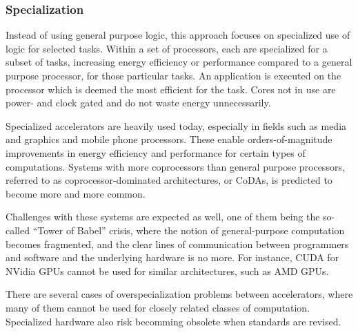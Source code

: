 
\subsubsection{Specialization}
Instead of using general purpose logic, this approach focuses on specialized use of logic for selected tasks.
Within a set of processors, each are specialized for a subset of tasks, increasing energy efficiency or performance compared to a general purpose processor, for those particular tasks.
An application is executed on the processor which is deemed the most efficient for the task.
Cores not in use are power- and clock gated and do not waste energy unnecessarily.

Specialized accelerators are heavily used today, especially in fields such as media and graphics and mobile phone processors.
These enable orders-of-magnitude improvements in energy efficiency and performance for certain types of computations.
Systems with more coprocessors than general purpose processors, referred to as coprocessor-dominated architectures, or CoDAs, is predicted to become more and more common.

Challenges with these systems are expected as well, one of them being the so-called ``Tower of Babel'' crisis, where
the notion of general-purpose computation becomes fragmented, and the clear lines of communication between programmers and software and the underlying hardware is no more.
For instance, CUDA for NVidia GPUs cannot be used for similar architectures, such as AMD GPUs.

There are several cases of overspecialization problems between accelerators, where many of them cannot be used for closely related classes of computation.
Specialized hardware also risk becomming obsolete when standards are revised. \cite{dark-silicon}

